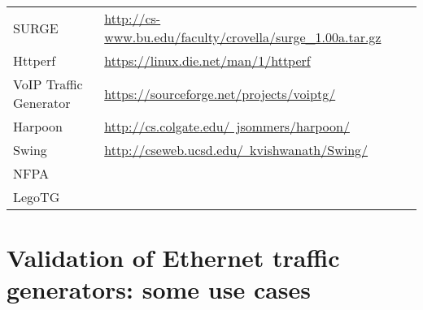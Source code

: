 \begin{table}[ht!]
\begin{tabularx}{\textwidth}{@{}ll@{} p{10.0cm}}
SURGE                   & \href{http://cs-www.bu.edu/faculty/crovella/surge_1.00a.tar.gz}{http://cs-www.bu.edu/faculty/crovella/surge\_1.00a.tar.gz}                                                                                                \\
Httperf                 & \href{https://linux.die.net/man/1/httperf}{https://linux.die.net/man/1/httperf}                                                                                                                                           \\
VoIP Traffic Generator  &    \href{https://sourceforge.net/projects/voiptg/}{https://sourceforge.net/projects/voiptg/}                                                                                                                                                                                                                       \\
Harpoon                 & \href{http://cs.colgate.edu/~jsommers/harpoon/}{http://cs.colgate.edu/~jsommers/harpoon/}                                                                                                                                 \\
Swing                   & \href{http://cseweb.ucsd.edu/~kvishwanath/Swing/}{http://cseweb.ucsd.edu/~kvishwanath/Swing/}                                                                                                                             \\
NFPA                    &                                                                                                                                                                                                                           \\
LegoTG                  &                                                                                                                                                                                                                           \\ \bottomrule
\end{tabularx}
\end{table}



\section{Validation of Ethernet traffic generators: some use cases}


